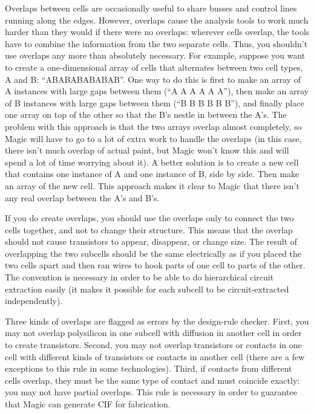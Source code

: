 \documentclass[letterpaper,twoside,12pt]{article}
\begin{document}
Overlaps between cells are occasionally useful to share busses
and control lines running along the edges.  However, overlaps
cause the analysis tools to work much harder than they would if
there were no overlaps:  wherever cells overlap, the tools have
to combine the information from the two separate cells.  Thus,
you shouldn't use overlaps any more than absolutely necessary.  For example,
suppose you want to create a one-dimensional array of cells that
alternates between two cell types, A and B:  ``ABABABABABAB''.  One
way to do this is first to make an array of A instances with large
gaps between them (``A  A  A  A  A  A''), then make an array of
B instances with large gaps between them (``B  B  B  B  B  B''),
and finally place one array on top of the other so that the B's
nestle in between the A's.  The problem with this approach is that
the two arrays overlap almost completely, so Magic will have to
go to a lot of extra work to handle the overlaps (in this case, there
isn't much overlap of actual paint, but Magic won't know this
and will spend a lot of time worrying about it).  A better solution
is to create a new cell that contains one instance of A and one
instance of B, side by side.  Then make an array of the new cell.
This approach makes it clear to Magic that there isn't any real
overlap between the A's and B's.

If you do create overlaps, you should use the overlaps only to
connect the two cells together, and not to change their structure.
This means that the overlap should not cause transistors to appear,
disappear, or change size.  The result of overlapping the two subcells
should be the same electrically as if you placed the two cells apart
and then ran wires to hook parts of one cell to parts of the other.  The
convention is necessary in order to be able to do hierarchical
circuit extraction easily (it makes it possible for each subcell
to be circuit-extracted independently).

Three kinds of overlaps
are flagged as errors by the design-rule checker.  First, you may
not overlap polysilicon in one subcell with diffusion in another
cell in order to create transistors.  Second, you may not overlap
transistors or contacts in one cell with different kinds of transistors
or contacts in another cell (there are a few exceptions to this rule
in some technologies).  Third, if contacts from different cells overlap,
they must be the same type of contact and must coincide exactly:
you may not have partial overlaps.  This rule is necessary
in order to guarantee that Magic can generate CIF for fabrication.
\end{document}
